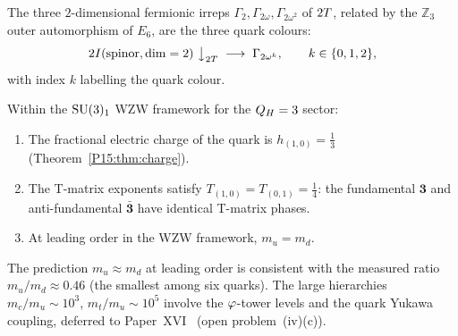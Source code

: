 \begin{proposition}
\label{P15:prop:colours}
The three $2$-dimensional fermionic irreps
$\Gamma_2,\Gamma_{2\omega},\Gamma_{2\omega^2}$ of $2T$,
related by the $\mathbb{Z}_3$ outer automorphism of $E_6$,
are the three quark colours:
\begin{equation}
  2I(\text{spinor}, \dim=2)\;\big\downarrow_{2T}\;
  \longrightarrow\; \Gamma_{2\omega^k},
  \qquad k\in\{0,1,2\},
  \label{P15:eq:branching_P15}
\end{equation}
with index $k$ labelling the quark colour.
\end{proposition}

\begin{theorem}
\label{P15:thm:massdegen}
Within the $\mathrm{SU}(3)_1$ WZW framework for the $Q_H=3$ sector:
\begin{enumerate}[noitemsep,label=(\roman*)]
\item The fractional electric charge of the quark is
  $h_{(1,0)}=\tfrac{1}{3}$ (Theorem~\ref{P15:thm:charge}).
\item The T-matrix exponents satisfy
  $T_{(1,0)}=T_{(0,1)}=\tfrac{1}{4}$: the fundamental
  $\mathbf{3}$ and anti-fundamental $\bar{\mathbf{3}}$ have
  identical T-matrix phases.
\item At leading order in the WZW framework, $m_u=m_d$.
\end{enumerate}
\end{theorem}

\begin{remark}
\label{P15:rem:consistency_with_observation}
The prediction $m_u\approx m_d$ at leading order is consistent
with the measured ratio $m_u/m_d\approx 0.46$ (the smallest among six quarks).
The large hierarchies $m_c/m_u\sim10^3$, $m_t/m_u\sim10^5$
involve the $\varphi$-tower levels and the quark Yukawa coupling,
deferred to Paper~XVI~\cite{Paper16} (open problem~(iv)(c)).
\end{remark}
